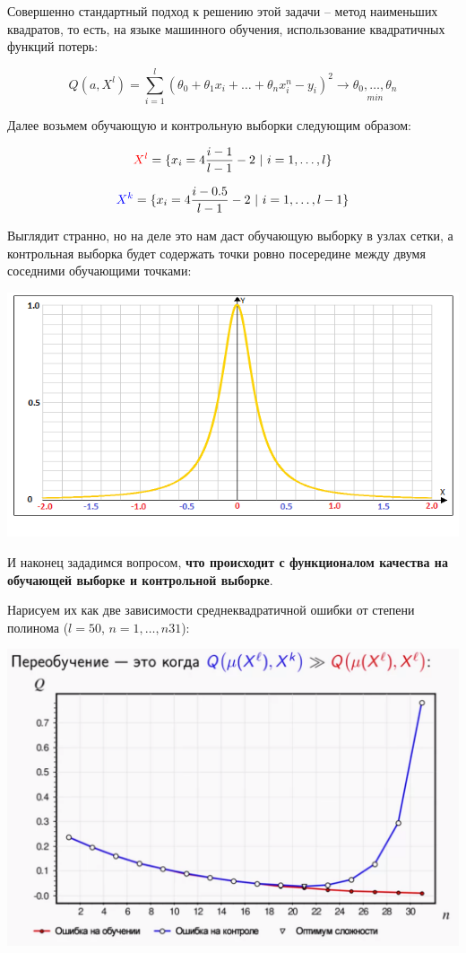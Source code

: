 \documentclass{article}
\begin{document}
Совершенно стандартный подход к решению этой задачи -- метод наименьших квадратов, то есть, на языке машинного обучения, использование квадратичных функций потерь:

$$Q(a, X^l) =
\sum\limits_{i = 1}^l (\theta_0 + \theta_1 x_i + \ldots + \theta_n x_i^n - y_i)^2
\rightarrow \underset{min}{\theta_0,\ldots,\theta_n}$$

Далее возьмем обучающую и контрольную выборки следующим образом:

$$\textcolor{red}{X^l} = \{x_i = 4\frac{i - 1}{l - 1} - 2\ |\ i = 1,\ldots, l\}$$

$$\textcolor{blue}{X^k} = \{x_i = 4\frac{i - 0.5}{l - 1} - 2\ |\ i = 1,\ldots, l - 1\}$$

Выглядит странно, но на деле это нам даст обучающую выборку в узлах сетки, а контрольная выборка будет содержать точки ровно посередине между двумя соседними обучающими точками:

\begin{center}
    \includegraphics[scale=0.8]{images/2_3.png}
\end{center}

И наконец зададимся вопросом, \textbf{что происходит с функционалом качества на обучающей выборке и контрольной выборке}.

Нарисуем их как две зависимости среднеквадратичной ошибки от степени полинома ($l = 50$, $n = 1,\ldots,n31$):

\begin{center}
    \includegraphics[scale=0.4]{images/2_4.png}
\end{center}
\end{document}
